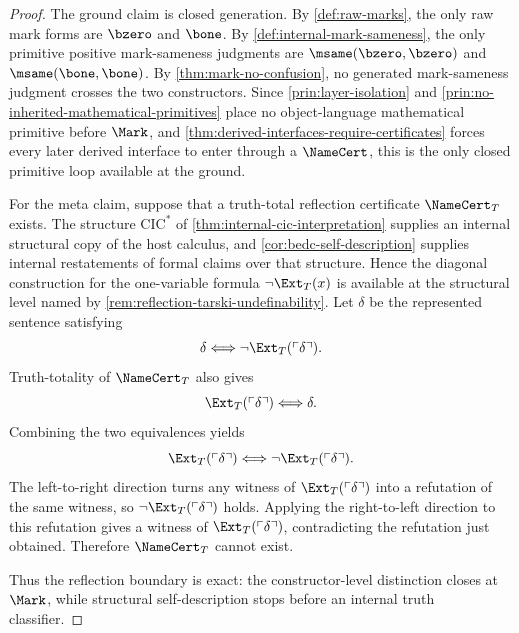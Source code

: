 \begin{proof}
The ground claim is closed generation. By \autoref{def:raw-marks}, the only raw mark forms are $\bzero$ and $\bone$. By \autoref{def:internal-mark-sameness}, the only primitive positive mark-sameness judgments are $\msame(\bzero,\bzero)$ and $\msame(\bone,\bone)$. By \autoref{thm:mark-no-confusion}, no generated mark-sameness judgment crosses the two constructors. Since \autoref{prin:layer-isolation} and \autoref{prin:no-inherited-mathematical-primitives} place no object-language mathematical primitive before $\Mark$, and \autoref{thm:derived-interfaces-require-certificates} forces every later derived interface to enter through a $\NameCert$, this is the only closed primitive loop available at the ground.

For the meta claim, suppose that a truth-total reflection certificate $\NameCert_T$ exists. The structure $\mathrm{CIC}^{*}$ of \autoref{thm:internal-cic-interpretation} supplies an internal structural copy of the host calculus, and \autoref{cor:bedc-self-description} supplies internal restatements of formal claims over that structure. Hence the diagonal construction for the one-variable formula $\neg\Ext_T(x)$ is available at the structural level named by \autoref{rem:reflection-tarski-undefinability}. Let $\delta$ be the represented sentence satisfying
$$
\delta\Longleftrightarrow \neg\Ext_T(\ulcorner\delta\urcorner).
$$
Truth-totality of $\NameCert_T$ also gives
$$
\Ext_T(\ulcorner\delta\urcorner)\Longleftrightarrow \delta.
$$
Combining the two equivalences yields
$$
\Ext_T(\ulcorner\delta\urcorner)\Longleftrightarrow \neg\Ext_T(\ulcorner\delta\urcorner).
$$
The left-to-right direction turns any witness of $\Ext_T(\ulcorner\delta\urcorner)$ into a refutation of the same witness, so $\neg\Ext_T(\ulcorner\delta\urcorner)$ holds. Applying the right-to-left direction to this refutation gives a witness of $\Ext_T(\ulcorner\delta\urcorner)$, contradicting the refutation just obtained. Therefore $\NameCert_T$ cannot exist.

Thus the reflection boundary is exact: the constructor-level distinction closes at $\Mark$, while structural self-description stops before an internal truth classifier.
\end{proof}
